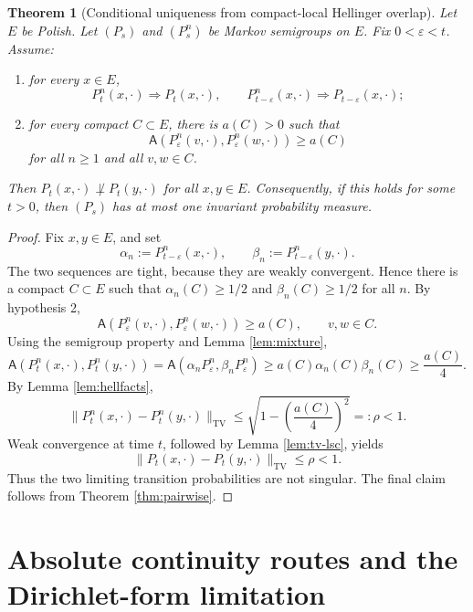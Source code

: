 \documentclass[12pt]{article}
\newcommand{\1}{\mathbf 1}
\newcommand{\TV}{\mathrm{TV}}
\newcommand{\Aff}{\mathsf A}
\theoremstyle{plain}
\newtheorem{theorem}{Theorem}[section]
\theoremstyle{definition}
\theoremstyle{remark}
\numberwithin{equation}{section}
\begin{document}
\begin{theorem}[Conditional uniqueness from compact-local Hellinger overlap]\label{thm:hellinger}
Let \(E\) be Polish.  Let \((P_s)\) and \((P_s^n)\) be Markov semigroups on
\(E\).  Fix \(0<\varepsilon<t\).  Assume:
\begin{enumerate}
\item for every \(x\in E\),
\[
P_t^n(x,\cdot)\Rightarrow P_t(x,\cdot),
\qquad
P_{t-\varepsilon}^n(x,\cdot)\Rightarrow P_{t-\varepsilon}(x,\cdot);
\]
\item for every compact \(C\subset E\), there is \(a(C)>0\) such that
\[
\Aff(P_\varepsilon^n(v,\cdot),P_\varepsilon^n(w,\cdot))\ge a(C)
\]
for all \(n\ge1\) and all \(v,w\in C\).
\end{enumerate}
Then \(P_t(x,\cdot)\not\perp P_t(y,\cdot)\) for all \(x,y\in E\).  Consequently,
if this holds for some \(t>0\), then \((P_s)\) has at most one invariant
probability measure.
\end{theorem}

\begin{proof}
Fix \(x,y\in E\), and set
\[
\alpha_n:=P_{t-\varepsilon}^n(x,\cdot),\qquad
\beta_n:=P_{t-\varepsilon}^n(y,\cdot).
\]
The two sequences are tight, because they are weakly convergent.  Hence there
is a compact \(C\subset E\) such that
\(\alpha_n(C)\ge1/2\) and \(\beta_n(C)\ge1/2\) for all \(n\).  By hypothesis 2,
\[
\Aff(P_\varepsilon^n(v,\cdot),P_\varepsilon^n(w,\cdot))\ge a(C),
\qquad v,w\in C.
\]
Using the semigroup property and Lemma \ref{lem:mixture},
\[
\Aff(P_t^n(x,\cdot),P_t^n(y,\cdot))
=
\Aff(\alpha_nP_\varepsilon^n,\beta_nP_\varepsilon^n)
\ge
a(C)\alpha_n(C)\beta_n(C)\ge \frac{a(C)}4.
\]
By Lemma \ref{lem:hellfacts},
\[
\|P_t^n(x,\cdot)-P_t^n(y,\cdot)\|_{\TV}
\le
\sqrt{1-\left(\frac{a(C)}4\right)^2}
=:\rho<1.
\]
Weak convergence at time \(t\), followed by Lemma \ref{lem:tv-lsc}, yields
\[
\|P_t(x,\cdot)-P_t(y,\cdot)\|_{\TV}\le\rho<1.
\]
Thus the two limiting transition probabilities are not singular.  The final
claim follows from Theorem \ref{thm:pairwise}.
\end{proof}

\section{Absolute continuity routes and the Dirichlet-form limitation}
\end{document}

